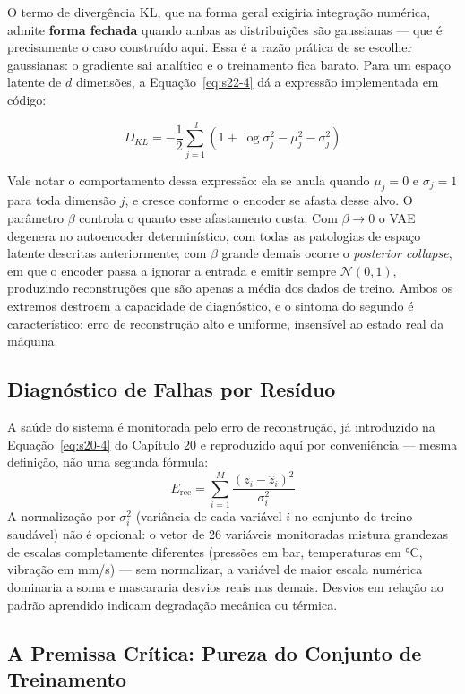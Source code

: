 \documentclass[12pt,a4paper]{article}
\numberwithin{equation}{section}
\numberwithin{table}{section}
\numberwithin{figure}{section}
\begin{document}
	O termo de divergência KL, que na forma geral exigiria integração numérica, admite \textbf{forma fechada} quando ambas as distribuições são gaussianas — que é precisamente o caso construído aqui. Essa é a razão prática de se escolher gaussianas: o gradiente sai analítico e o treinamento fica barato. Para um espaço latente de $d$ dimensões, a Equação~\eqref{eq:s22-4} dá a expressão implementada em código:

	\begin{equation}\label{eq:s22-4}
	D_{KL} = -\frac{1}{2} \sum_{j=1}^{d} \left( 1 + \log \sigma_j^2 - \mu_j^2 - \sigma_j^2 \right)
\end{equation}

	Vale notar o comportamento dessa expressão: ela se anula quando $\mu_j = 0$ e $\sigma_j = 1$ para toda dimensão $j$, e cresce conforme o encoder se afasta desse alvo. O parâmetro $\beta$ controla o quanto esse afastamento custa. Com $\beta \to 0$ o VAE degenera no autoencoder determinístico, com todas as patologias de espaço latente descritas anteriormente; com $\beta$ grande demais ocorre o \textit{posterior collapse}, em que o encoder passa a ignorar a entrada e emitir sempre $\mathcal{N}(0,1)$, produzindo reconstruções que são apenas a média dos dados de treino. Ambos os extremos destroem a capacidade de diagnóstico, e o sintoma do segundo é característico: erro de reconstrução alto e uniforme, insensível ao estado real da máquina.

	\subsection{Diagnóstico de Falhas por Resíduo}
	A saúde do sistema é monitorada pelo erro de reconstrução, já introduzido na Equação~\eqref{eq:s20-4} do Capítulo 20 e reproduzido aqui por conveniência — mesma definição, não uma segunda fórmula:
	\begin{equation}\label{eq:s22-5}
 E_{\text{rec}} = \sum_{i=1}^{M} \frac{(z_i - \hat{z}_i)^2}{\sigma_i^2}
\end{equation}
	A normalização por $\sigma_i^2$ (variância de cada variável $i$ no conjunto de treino saudável) não é opcional: o vetor de 26 variáveis monitoradas mistura grandezas de escalas completamente diferentes (pressões em bar, temperaturas em °C, vibração em mm/s) — sem normalizar, a variável de maior escala numérica dominaria a soma e mascararia desvios reais nas demais. Desvios em relação ao padrão aprendido indicam degradação mecânica ou térmica.

	\subsection{A Premissa Crítica: Pureza do Conjunto de Treinamento}
\end{document}
